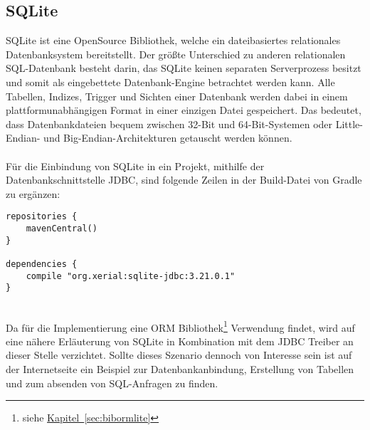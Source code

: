 \subsection{SQLite}\label{sec:bibsqlite}
SQLite ist eine OpenSource Bibliothek, welche ein dateibasiertes relationales Datenbanksystem bereitstellt. Der größte Unterschied zu anderen relationalen SQL-Datenbank besteht darin, das SQLite keinen separaten Serverprozess besitzt und somit als eingebettete Datenbank-Engine betrachtet werden kann. Alle Tabellen, Indizes, Trigger und Sichten einer Datenbank werden dabei in einem plattformunabhängigen Format in einer einzigen Datei gespeichert. Das bedeutet, dass Datenbankdateien bequem zwischen 32-Bit und 64-Bit-Systemen oder Little-Endian- und Big-Endian-Architekturen getauscht werden können. \cite{sqliteAbout}\\
\\
Für die Einbindung von SQLite in ein Projekt, mithilfe der Datenbankschnittstelle \gls{JDBC}, sind folgende Zeilen in der Build-Datei von Gradle zu ergänzen:
\\
\begin{lstlisting}[style=lstStyleFramed, language=Gradle, caption={Einbindung der Bibliothek SQLite mithilfe von Gradle}, label=lst:sqlite, float]
repositories {
	mavenCentral()
}

dependencies {
	compile "org.xerial:sqlite-jdbc:3.21.0.1"
}
\end{lstlisting}
\\
Da für die Implementierung eine \gls{ORM} Bibliothek\footnote{siehe \hyperref[sec:bibormlite]{Kapitel~\ref{sec:bibormlite}}} Verwendung findet, wird auf eine nähere Erläuterung von SQLite in Kombination mit dem \gls{JDBC} Treiber an dieser Stelle verzichtet. Sollte dieses Szenario dennoch von Interesse sein ist auf der Internetseite \cite{sqliteJDBCTutorial} ein Beispiel zur Datenbankanbindung, Erstellung von Tabellen und zum absenden von SQL-Anfragen zu finden.


